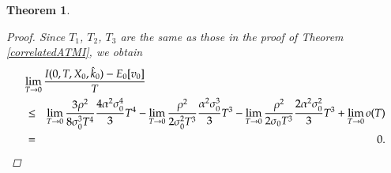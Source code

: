 \documentclass[11pt]{article}
\newtheorem{theorem}{Theorem}
\begin{document}
\begin{theorem}
\begin{proof}

Since $T_1$, $T_2$, $T_3$ are the same as those in the proof of Theorem \ref{correlatedATMI}, we obtain
\begin{eqnarray}
\lefteqn{\lim_{T\rightarrow 0}\frac{I( 0,T,X_0,\hat{k}_0) -E_{0}[v_{0}]} {T}}\nonumber \\
&\le& 
\lim_{T\rightarrow 0}\frac{3\rho^{2}}{8\sigma _{0}^{3}T^{4}} \frac{4 \alpha^2 \sigma_0^4}{3}T^4
- \lim_{T\rightarrow 0}\frac{\rho ^{2}}{{2\sigma _{0}^2T^{3}}}\frac{\alpha^2 \sigma_0^3}{3}T^3
- \lim_{T\rightarrow 0}\frac{\rho ^{2}}{2\sigma _{0}T^{3}} \frac{2 \alpha^2\sigma_0^2}{3}T^3 + \lim_{T\to 0}o(T)\nonumber\\
&=&0.
\end{eqnarray}
\end{proof}
\end{theorem}
\end{document}
